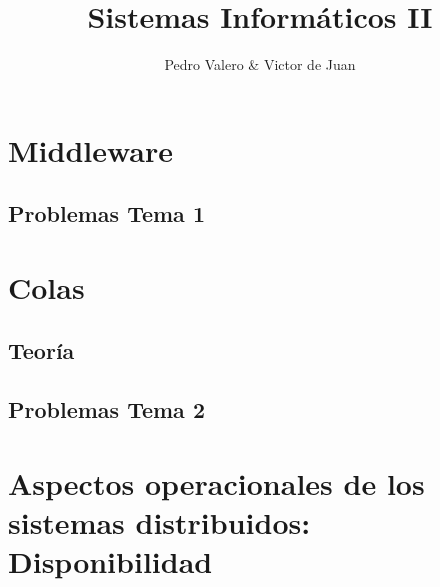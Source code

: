 \documentclass{apuntes}
\author{Pedro Valero & Victor de Juan}
\title{Sistemas Informáticos II}
\begin{document}
\maketitle
\newpage
\tableofcontents


\chapter{Middleware}


\section{Problemas Tema 1}
\newpage


\chapter{Colas}
\section{Teoría}
\section{Problemas Tema 2}



\chapter{Aspectos operacionales de los sistemas distribuidos: Disponibilidad}

\end{document}
